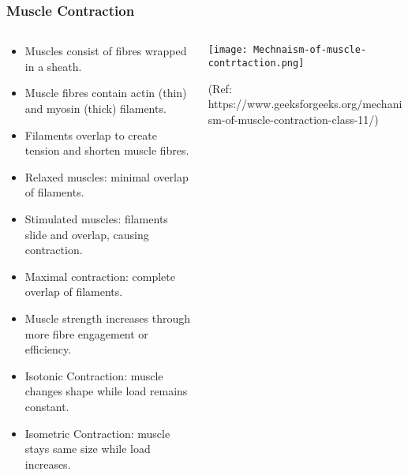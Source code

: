 \begin{frame}[fragile]\frametitle{Muscle Contraction}
\begin{columns}
    \begin{column}[T]{0.5\linewidth}
      \begin{itemize}
		\item Muscles consist of fibres wrapped in a sheath.
		\item Muscle fibres contain actin (thin) and myosin (thick) filaments.
		\item Filaments overlap to create tension and shorten muscle fibres.
		\item Relaxed muscles: minimal overlap of filaments.
		\item Stimulated muscles: filaments slide and overlap, causing contraction.
		\item Maximal contraction: complete overlap of filaments.
		\item Muscle strength increases through more fibre engagement or efficiency.
		\item Isotonic Contraction: muscle changes shape while load remains constant.
		\item Isometric Contraction: muscle stays same size while load increases.
	  \end{itemize}
    \end{column}
    \begin{column}[T]{0.5\linewidth}
		\begin{center}
		\texttt{[image: Mechnaism-of-muscle-contrtaction.png]}
		
		
						
		{\tiny (Ref: https://www.geeksforgeeks.org/mechanism-of-muscle-contraction-class-11/)}		
		\end{center}	
    \end{column}
  \end{columns}
\end{frame}

